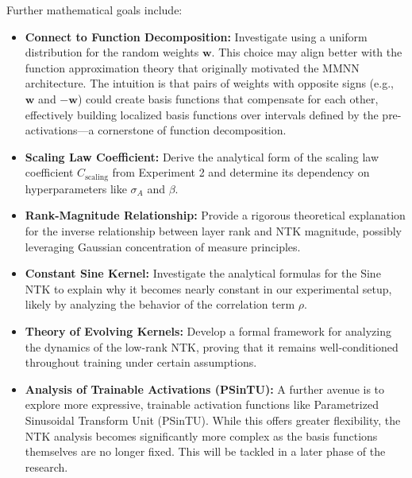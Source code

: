 \documentclass[a4paper]{article}
\begin{document}
Further mathematical goals include:
\begin{itemize}
    \item \textbf{Connect to Function Decomposition:} Investigate using a uniform distribution for the random weights $\bm{w}$. This choice may align better with the function approximation theory that originally motivated the MMNN architecture. The intuition is that pairs of weights with opposite signs (e.g., $\bm{w}$ and $-\bm{w}$) could create basis functions that compensate for each other, effectively building localized basis functions over intervals defined by the pre-activations—a cornerstone of function decomposition.
    \item \textbf{Scaling Law Coefficient:} Derive the analytical form of the scaling law coefficient $C_{\text{scaling}}$ from Experiment 2 and determine its dependency on hyperparameters like $\sigma_A$ and $\beta$.
    \item \textbf{Rank-Magnitude Relationship:} Provide a rigorous theoretical explanation for the inverse relationship between layer rank and NTK magnitude, possibly leveraging Gaussian concentration of measure principles.
    \item \textbf{Constant Sine Kernel:} Investigate the analytical formulas for the Sine NTK to explain why it becomes nearly constant in our experimental setup, likely by analyzing the behavior of the correlation term $\rho$.
    \item \textbf{Theory of Evolving Kernels:} Develop a formal framework for analyzing the dynamics of the low-rank NTK, proving that it remains well-conditioned throughout training under certain assumptions.
    \item \textbf{Analysis of Trainable Activations (PSinTU):} A further avenue is to explore more expressive, trainable activation functions like Parametrized Sinusoidal Transform Unit (PSinTU). While this offers greater flexibility, the NTK analysis becomes significantly more complex as the basis functions themselves are no longer fixed. This will be tackled in a later phase of the research.
\end{itemize}
\end{document}
